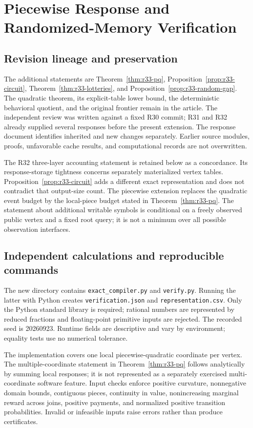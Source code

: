 \section{Piecewise Response and Randomized-Memory Verification}\label{ec:r33}
\subsection{Revision lineage and preservation}
The additional statements are Theorem~\ref{thm:r33-pq}, Proposition~\ref{prop:r33-circuit}, Theorem~\ref{thm:r33-lotteries}, and Proposition~\ref{prop:r33-random-gap}. The quadratic theorem, its explicit-table lower bound, the deterministic behavioral quotient, and the original frontier remain in the article. The independent review was written against a fixed R30 commit; R31 and R32 already supplied several responses before the present extension. The response document identifies inherited and new changes separately. Earlier source modules, proofs, unfavorable cache results, and computational records are not overwritten.

The R32 three-layer accounting statement is retained below as a concordance. Its response-storage tightness concerns separately materialized vertex tables. Proposition~\ref{prop:r33-circuit} adds a different exact representation and does not contradict that output-size count. The piecewise extension replaces the quadratic event budget by the local-piece budget stated in Theorem~\ref{thm:r33-pq}. The statement about additional writable symbols is conditional on a freely observed public vertex and a fixed root query; it is not a minimum over all possible observation interfaces.

\subsection{Independent calculations and reproducible commands}
The new directory contains \texttt{exact\_compiler.py} and \texttt{verify.py}. Running the latter with Python creates \texttt{verification.json} and \texttt{representation.csv}. Only the Python standard library is required; rational numbers are represented by reduced fractions and floating-point primitive inputs are rejected. The recorded seed is 20260923. Runtime fields are descriptive and vary by environment; equality tests use no numerical tolerance.

The implementation covers one local piecewise-quadratic coordinate per vertex. The multiple-coordinate statement in Theorem~\ref{thm:r33-pq} follows analytically by summing local responses; it is not represented as a separately exercised multi-coordinate software feature. Input checks enforce positive curvature, nonnegative domain bounds, contiguous pieces, continuity in value, nonincreasing marginal reward across joins, positive payments, and normalized positive transition probabilities. Invalid or infeasible inputs raise errors rather than produce certificates.

